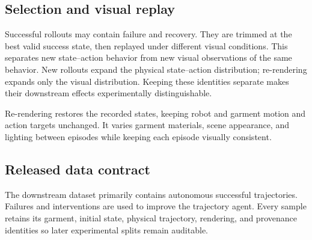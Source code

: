 \subsection{Selection and visual replay}

Successful rollouts may contain failure and recovery. They are trimmed at the
best valid success state, then replayed under different visual conditions. This
separates new state--action behavior from new visual observations of the same
behavior. New rollouts expand the physical state--action distribution;
re-rendering expands only the visual distribution. Keeping these identities
separate makes their downstream effects experimentally distinguishable.

Re-rendering restores the recorded states, keeping robot and garment motion
and action targets unchanged. It varies garment materials, scene appearance,
and lighting between episodes while keeping each episode visually consistent.

\subsection{Released data contract}

The downstream dataset primarily contains autonomous successful trajectories.
Failures and interventions are used to improve the trajectory agent. Every
sample retains its garment, initial state, physical trajectory, rendering, and
provenance identities so later experimental splits remain auditable.
